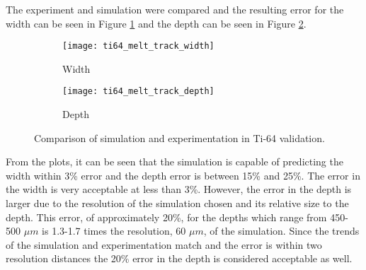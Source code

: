 The experiment and simulation were compared and the resulting error for the width can be seen in Figure \ref{fig:ti64_melt_track_width} and the depth can be seen in Figure \ref{fig:ti64_melt_track_depth}.
\begin{figure}[!htb]\centering
	\begin{subfigure}[c]{0.45\textwidth}\centering
	\texttt{[image: ti64\_melt\_track\_width]}
	\caption{Width}
	\label{fig:ti64_melt_track_width}
	\end{subfigure}\hfill{}
		\begin{subfigure}[c]{0.45\textwidth}\centering
		\texttt{[image: ti64\_melt\_track\_depth]}
		\caption{Depth}
		\label{fig:ti64_melt_track_depth}
		\end{subfigure}
	\caption{Comparison of simulation and experimentation in Ti-64 validation.}
	\label{fig:ti64_melt_track}
\end{figure}
From the plots, it can be seen that the simulation is capable of predicting the width within 3\% error and the depth error is between 15\% and 25\%.  The error in the width is very acceptable at less than 3\%.
However, the error in the depth is larger due to the resolution of the simulation chosen and its relative size to the depth.  This error, of approximately 20\%, for the depths which range from 450-500 $\mu m$ is 1.3-1.7 times the resolution, 60 $\mu m$, of the simulation.  Since the trends of the simulation and experimentation match and the error is within two resolution distances the 20\% error in the depth is considered acceptable as well. 
